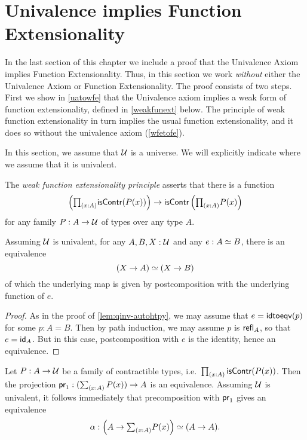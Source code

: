 \section{Univalence implies Function Extensionality}
\label{sec:univalence}

In the last section of this chapter we include a proof that the Univalence Axiom implies Function
Extensionality. Thus, in this section we work \emph{without} either the Univalence Axiom
or Function Extensionality. The proof consists of two steps. First we show
in \autoref{uatowfe} that the Univalence
axiom implies a weak form of function extensionality, defined in \autoref{weakfunext} below. The
principle of weak function extensionality in turn implies the usual function extensionality,
and it does so without the univalence axiom (\autoref{wfetofe}).

In this section, we assume that $\type$ is a universe.
We will explicitly indicate where we assume that it is univalent.

\begin{defn}\label{weakfunext}
The \emph{weak function extensionality principle} asserts that there is a function
\begin{equation*}
\left(\tprd{x:A}\iscontr(P(x))\right)
  \to\iscontr\left(\tprd{x:A}P(x)\right)
\end{equation*}
for any family $P:A\to\type$ of types over any type $A$.
\end{defn}

\begin{lem} \label{UA-eqv-hom-eqv}
Assuming $\type$ is univalent, for any $A,B,X:\type$ and any $e:\eqv{A}{B}$, there is an equivalence
\begin{equation*}
\eqv{(X\to A)}{(X\to B)}
\end{equation*}
of which the underlying map is given by postcomposition with the underlying function of $e$.
\end{lem}

\begin{proof}
  As in the proof of \autoref{lem:qinv-autohtpy}, we may assume that $e = \idtoeqv(p)$ for some $p:A=B$.
  Then by path induction, we may assume $p$ is $\refl{A}$, so that $e = \idfunc[A]$.
  But in this case, postcomposition with $e$ is the identity, hence an equivalence.
\end{proof}

\begin{cor}\label{contrfamtotalpostcompequiv}
Let $P:A\to\type$ be a family of contractible types, i.e.\ $\prd{x:A}\iscontr(P(x))$.
Then the projection $\proj{1}:(\sm{x:A}P(x))\to A$ is an equivalence. Assuming $\type$ is univalent, it follows immediately that precomposition with $\proj{1}$ gives an equivalence
\begin{equation*}
\alpha : \eqv{\left(A\to\tsm{x:A}P(x)\right)}{(A\to A)}.
\end{equation*}
\end{cor}

